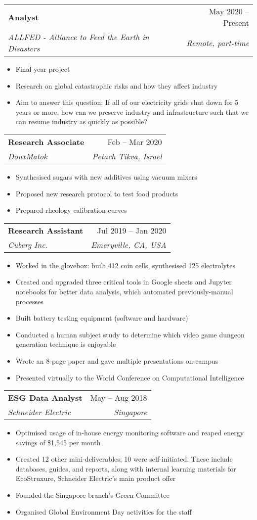 \documentclass[a4paper,11pt]{article}
\makeatletter
\newcommand{\resumeItem}[1]{
	\item\small{
		{#1 \vspace{-2pt}}
	}
}
\newcommand{\resumeSubheading}[4]{
	\vspace{-2pt}\item
	\begin{tabular*}{0.97\textwidth}[t]{l@{\extracolsep{\fill}}r}
		\textbf{#1} & #2 \\
		\textit{\small#3} & \textit{\small #4} \\
	\end{tabular*}\vspace{-7pt}
}
\newcommand{\resumeSubSubheading}[2]{
	\item
	\begin{tabular*}{0.97\textwidth}{l@{\extracolsep{\fill}}r}
		\textit{\small#1} & \textit{\small #2} \\
	\end{tabular*}\vspace{-7pt}
}
\newcommand{\resumeSubHeadingListEnd}{\end{itemize}}
\newcommand{\resumeItemListStart}{\begin{itemize}}
\newcommand{\resumeItemListEnd}{\end{itemize}\vspace{-5pt}}
\makeatother
\begin{document}
	\resumeSubheading
	{Analyst}{May 2020 -- Present}
	{ALLFED - Alliance to Feed the Earth in Disasters}{Remote, part-time}
	\resumeItemListStart
	\resumeItem{Final year project}
	\resumeItem{Research on global catastrophic risks and how they affect industry}
	\resumeItem{Aim to answer this question: If all of our electricity grids shut down for 5 years or more, how can we preserve industry and infrastructure such that we can resume industry as quickly as possible?}
	\resumeItemListEnd
	
	\resumeSubheading
	{Research Associate}{Feb -- Mar 2020}
	{DouxMatok}{Petach Tikva, Israel}
	\resumeItemListStart
	\resumeItem{Synthesised sugars with new additives using vacuum mixers}
	\resumeItem{Proposed new research protocol to test food products}
	\resumeItem{Prepared rheology calibration curves}
	\resumeItemListEnd
	
	\resumeSubheading
	{Research Assistant}{Jul 2019 -- Jan 2020}
	{Cuberg Inc.}{Emeryville, CA, USA}
	\resumeItemListStart
	\resumeItem{Worked in the glovebox: built 412 coin cells, synthesised 125 electrolytes}
	\resumeItem{Created and upgraded three critical tools in Google sheets and Jupyter notebooks for better data analysis, which automated previously-manual processes}
	\resumeItem{Built battery testing equipment (software and hardware)}
	\resumeItem{Conducted  a human subject study to determine which video game dungeon generation technique is enjoyable}
	\resumeItem{Wrote an 8-page paper and gave multiple presentations on-campus}
	\resumeItem{Presented virtually to the World Conference on Computational Intelligence}
	\resumeItemListEnd
	
	\iffalse
	\resumeSubSubheading
	{Software Engineer I}{Oct 2014 - Sep 2016}
	\resumeItemListStart
	\resumeItem{Apache Beam}
	{Apache Beam is a unified model for defining both batch and streaming data-parallel processing pipelines}
	\resumeItemListEnd
	\resumeSubHeadingListEnd
	
	\fi
	
	\resumeSubheading
	{ESG Data Analyst}{May -- Aug 2018}
	{Schneider Electric}{Singapore}
	\resumeItemListStart
	\resumeItem{Optimised usage of in-house energy monitoring software and reaped energy savings of \$1,545 per month}
	\resumeItem{Created 12 other mini-deliverables; 10 were self-initiated. These include databases, guides, and reports, along with internal learning materials for EcoStruxure, Schneider Electric’s main product offer}
	\resumeItem{Founded the Singapore branch’s Green Committee}
	\resumeItem{Organised Global Environment Day activities for the staff}
	\resumeItemListEnd
	
\end{document}
